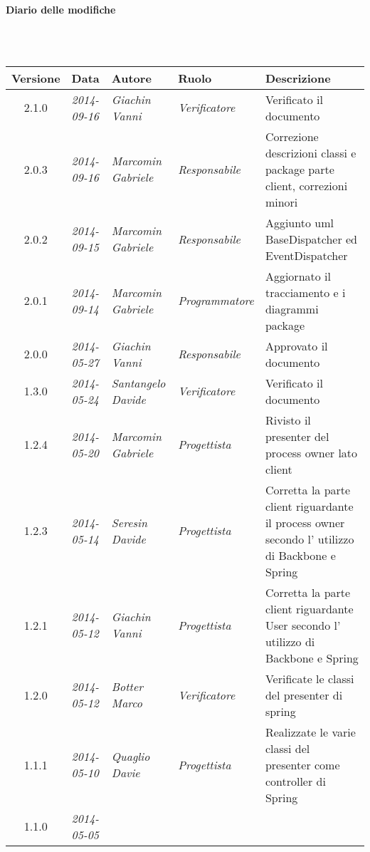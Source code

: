 \noindent\begin{Large}\textbf{Diario delle modifiche}\end{Large}\\
\\
\begin{small}
\begin{tabular}{|c|p{1.8cm}|p{2.8cm}|p{2.8cm}|p{3.5cm}|}
\hline
Versione & Data & Autore & Ruolo & Descrizione \\
\hline
\hline
2.1.0 & \textit{2014-09-16} & 
\textit{Giachin Vanni} &
\textit{Verificatore} & Verificato il documento\\
\hline
2.0.3 & \textit{2014-09-16} & 
\textit{Marcomin Gabriele} &
\textit{Responsabile} & Correzione descrizioni classi e package parte client, correzioni minori\\
\hline
2.0.2 & \textit{2014-09-15} & 
\textit{Marcomin Gabriele} &
\textit{Responsabile} & Aggiunto uml BaseDispatcher ed EventDispatcher\\
\hline
2.0.1 & \textit{2014-09-14} & 
\textit{Marcomin Gabriele} &
\textit{Programmatore} & Aggiornato il tracciamento e i diagrammi package\\
\hline
2.0.0 & \textit{2014-05-27} & 
\textit{Giachin Vanni} &
\textit{Responsabile} & Approvato il documento\\
\hline
1.3.0 & \textit{2014-05-24} & 
\textit{Santangelo Davide} &
\textit{Verificatore} & Verificato il documento\\
\hline
1.2.4 & \textit{2014-05-20} & 
\textit{Marcomin Gabriele} &
\textit{Progettista} & Rivisto il presenter del process owner lato client\\
\hline
1.2.3 & \textit{2014-05-14} & 
\textit{Seresin Davide} &
\textit{Progettista} & Corretta la parte client riguardante il process owner secondo l' utilizzo di Backbone e Spring\\
\hline
1.2.1 & \textit{2014-05-12} & 
\textit{Giachin Vanni} &
\textit{Progettista} & Corretta la parte client riguardante User secondo l' utilizzo di Backbone e Spring\\
\hline
1.2.0 & \textit{2014-05-12} & 
\textit{Botter Marco} &
\textit{Verificatore} & Verificate le classi del presenter di spring\\
\hline
1.1.1 & \textit{2014-05-10} & 
\textit{Quaglio Davie} &
\textit{Progettista} & Realizzate le varie classi del presenter come controller di Spring\\
\hline
1.1.0 & \textit{2014-05-05} & 

\end{tabular}
\end{small}
